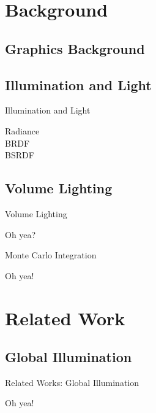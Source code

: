 \documentclass{beamer}
\begin{document}
\section{Background}
\subsection{Graphics Background}
\subsection{Illumination and Light}
\begin{frame}{Illumination and Light}

    Radiance\\
    BRDF\\
    BSRDF

\end{frame}




\subsection{Volume Lighting}
\begin{frame}{Volume Lighting}

    Oh yea?

\end{frame}




\begin{frame}{Monte Carlo Integration}

    Oh yea!

\end{frame}




\section{Related Work}
\subsection{Global Illumination}
\begin{frame}{Related Works: Global Illumination}

    Oh yea!

\end{frame}
\end{document}

